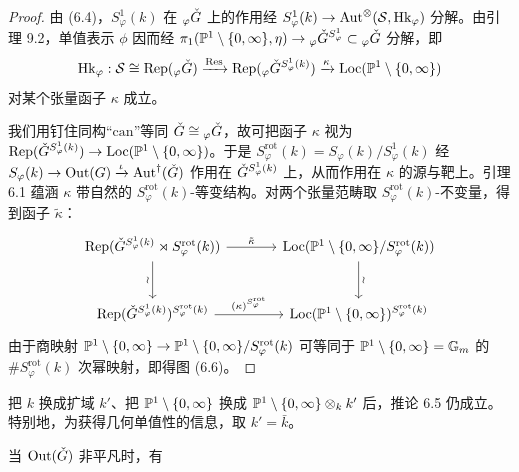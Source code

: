 \begin{proof}
由 (6.4)，$S^1_\varphi(k)$ 在 ${}_\varphi\check G$ 上的作用经 $S^1_\varphi(k)\to\operatorname{Aut}^\otimes(\mathcal S,\mathrm{Hk}_\varphi)$ 分解。由引理 9.2，单值表示 $\phi$ 因而经 $\pi_1(\mathbb{P}^1\setminus\{0,\infty\},\eta)\to{}_\varphi\check G^{S^1_\varphi}\subset{}_\varphi\check G$ 分解，即
\[
\mathrm{Hk}_\varphi:\mathcal S\cong\mathrm{Rep}({}_\varphi\check G)\xrightarrow{\mathrm{Res}}\mathrm{Rep}({}_\varphi\check G^{S^1_\varphi(k)})\xrightarrow{\kappa}\mathrm{Loc}(\mathbb{P}^1\setminus\{0,\infty\})
\]
对某个张量函子 $\kappa$ 成立。

我们用钉住同构“$\mathrm{can}$”等同 $\check G\cong{}_\varphi\check G$，故可把函子 $\kappa$ 视为 $\mathrm{Rep}(\check G^{S^1_\varphi(k)})\to\mathrm{Loc}(\mathbb{P}^1\setminus\{0,\infty\})$。于是 $S^{\mathrm{rot}}_\varphi(k)=S_\varphi(k)/S^1_\varphi(k)$ 经 $S_\varphi(k)\to\operatorname{Out}(G)\xrightarrow{\iota}\operatorname{Aut}^\dagger(\check G)$ 作用在 $\check G^{S^1_\varphi(k)}$ 上，从而作用在 $\kappa$ 的源与靶上。引理 6.1 蕴涵 $\kappa$ 带自然的 $S^{\mathrm{rot}}_\varphi(k)$-等变结构。对两个张量范畴取 $S^{\mathrm{rot}}_\varphi(k)$-不变量，得到函子 $\tilde\kappa$：
\[
\begin{tikzcd}[column sep=large, row sep=large]
\Rep(\ckG^{S^1_\varphi(k)}\rtimes S^{\mathrm{rot}}_\varphi(k)) \arrow[r, "\tilde\kappa"] \arrow[d, "\wr"'] & \Loc(\PP^1\setminus\{0,\infty\}/S^{\mathrm{rot}}_\varphi(k)) \arrow[d, "\wr"] \\
\Rep(\ckG^{S^1_\varphi(k)})^{S^{\mathrm{rot}}_\varphi(k)} \arrow[r, "(\kappa)^{S^{\mathrm{rot}}_\varphi}"] & \Loc(\PP^1\setminus\{0,\infty\})^{S^{\mathrm{rot}}_\varphi(k)}
\end{tikzcd}
\]
由于商映射 $\mathbb{P}^1\setminus\{0,\infty\}\to\mathbb{P}^1\setminus\{0,\infty\}/S^{\mathrm{rot}}_\varphi(k)$ 可等同于 $\mathbb{P}^1\setminus\{0,\infty\}=\mathbb{G}_m$ 的 $\#S^{\mathrm{rot}}_\varphi(k)$ 次幂映射，即得图 (6.6)。
\end{proof}

\begin{remark}
把 $k$ 换成扩域 $k'$、把 $\mathbb{P}^1\setminus\{0,\infty\}$ 换成 $\mathbb{P}^1\setminus\{0,\infty\}\otimes_kk'$ 后，推论 6.5 仍成立。特别地，为获得几何单值性的信息，取 $k'=\bar k$。
\end{remark}

当 $\operatorname{Out}(\check G)$ 非平凡时，有

